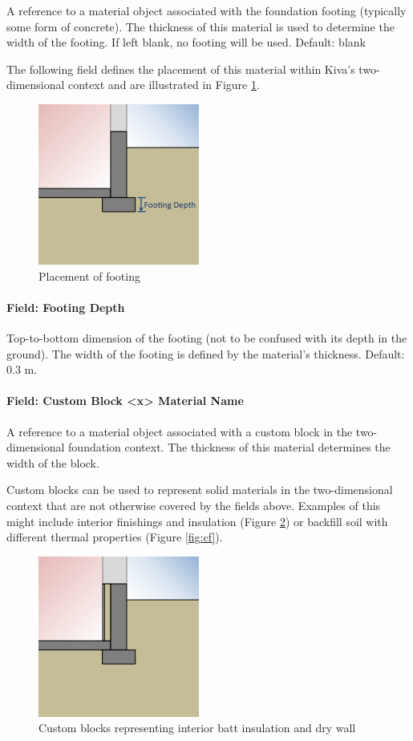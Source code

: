 A reference to a material object associated with the foundation footing
(typically some form of concrete). The thickness of this material is
used to determine the width of the footing. If left blank, no footing
will be used. Default: blank

The following field defines the placement of this material within Kiva's
two-dimensional context and are illustrated in Figure \ref{fig:foot}.

\begin{figure}
\centering
\includegraphics{media/kiva-2d-footing.png}
\caption{Placement of footing\label{fig:foot}}
\end{figure}

\paragraph{Field: Footing Depth}

Top-to-bottom dimension of the footing (not to be confused with its
depth in the ground). The width of the footing is defined by the
material's thickness. Default: 0.3 m.

\paragraph{Field: Custom Block \textless{}x\textgreater{} Material
Name}

A reference to a material object associated with a custom block in the
two-dimensional foundation context. The thickness of this material
determines the width of the block.

Custom blocks can be used to represent solid materials in the
two-dimensional context that are not otherwise covered by the fields
above. Examples of this might include interior finishings and insulation
(Figure \ref{fig:cw}) or backfill soil with different thermal properties
(Figure \ref{fig:cf}).

\begin{figure}
\centering
\includegraphics{media/kiva-2d-custom-ex-wall.png}
\caption{Custom blocks representing interior batt insulation and dry
wall\label{fig:cw}}
\end{figure}

